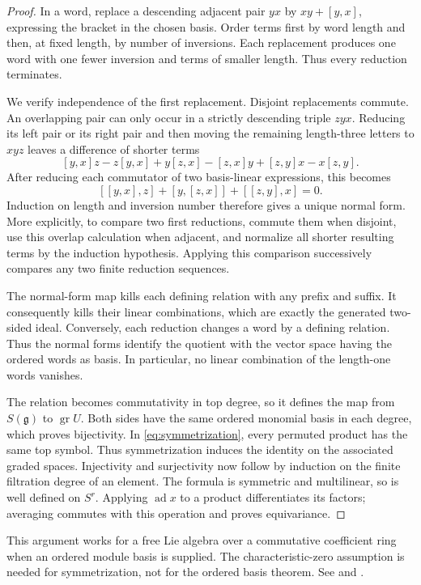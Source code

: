 \begin{proof}
In a word, replace a descending adjacent pair \(yx\) by
\(xy+[y,x]\), expressing the bracket in the chosen basis.
Order terms first by word length and then, at fixed length, by
number of inversions. Each replacement produces one word with
one fewer inversion and terms of smaller length. Thus every
reduction terminates.

We verify independence of the first replacement. Disjoint
replacements commute. An overlapping pair can only occur in
a strictly descending triple \(zyx\). Reducing its left pair or
its right pair and then moving the remaining length-three
letters to \(xyz\) leaves a difference of shorter terms
\[
 [y,x]z-z[y,x]+y[z,x]-[z,x]y+[z,y]x-x[z,y].
\]
After reducing each commutator of two basis-linear expressions,
this becomes
\[
 [[y,x],z]+[y,[z,x]]+[[z,y],x]=0.
\]
Induction on length and inversion number therefore gives a unique
normal form. More explicitly, to compare two first reductions,
commute them when disjoint, use this overlap calculation when
adjacent, and normalize all shorter resulting terms by the
induction hypothesis. Applying this comparison successively
compares any two finite reduction sequences.

The normal-form map kills each defining relation with any prefix
and suffix. It consequently kills their linear combinations,
which are exactly the generated two-sided ideal. Conversely,
each reduction changes a word by a defining relation. Thus the
normal forms identify the quotient with the vector space having
the ordered words as basis. In particular, no linear combination
of the length-one words vanishes.

The relation becomes commutativity in top degree, so it defines
the map from \(S(\mathfrak g)\) to \(\operatorname{gr}U\).
Both sides have the same ordered monomial basis in each degree,
which proves bijectivity. In \eqref{eq:symmetrization}, every
permuted product has the same top symbol. Thus symmetrization
induces the identity on the associated graded spaces.
Injectivity and surjectivity now follow by induction on the
finite filtration degree of an element. The formula is
symmetric and multilinear, so is well defined on \(S^r\).
Applying \(\operatorname{ad}x\) to a product differentiates its
factors; averaging commutes with this operation and proves
equivariance.
\end{proof}

This argument works for a free Lie algebra over a commutative
coefficient ring when an ordered module basis is supplied.
The characteristic-zero assumption is needed for
symmetrization, not for the ordered basis theorem. See
\cite[Sections 17.3--17.4]{humphreys} and
\cite[Section 13]{etingof}.

